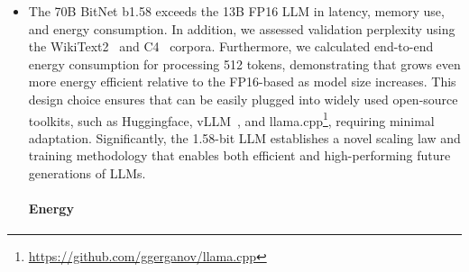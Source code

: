 \begin{itemize}
 builds upon the BitNet model, a Transformer variant in which the standard \emph{nn.Linear} layers are substituted by \emph{BitLinear} layers. This new variant preserves all key advantages of the original BitNet, including its fundamentally distinct computation framework that eliminates almost all multiplication during matrix multiplications and offers high optimization potential. This property leads to reductions in both the financial and temporal costs of loading weights from DRAM, facilitating faster and more efficient inference. Building on these developments, we propose and encourage the design of dedicated hardware and systems tailored specifically to the needs and computational properties of 1-bit LLMs, in light of the innovative computational paradigm established by BitNet~\cite{bitnet}. \item The 70B BitNet b1.58 exceeds the 13B FP16 LLM in latency, memory use, and energy consumption. In addition, we assessed validation perplexity using the WikiText2~\cite{wikitext2} and C4~\cite{c4} corpora. Furthermore, we calculated end-to-end energy consumption for processing 512 tokens, demonstrating that  grows even more energy efficient relative to the FP16-based  as model size increases. This design choice ensures that  can be easily plugged into widely used open-source toolkits, such as Huggingface, vLLM~\cite{vllm}, and llama.cpp\footnote{\url{https://github.com/ggerganov/llama.cpp}}, requiring minimal adaptation. Significantly, the 1.58-bit LLM establishes a novel scaling law and training methodology that enables both efficient and high-performing future generations of LLMs. \paragraph{Energy}


\end{itemize}
